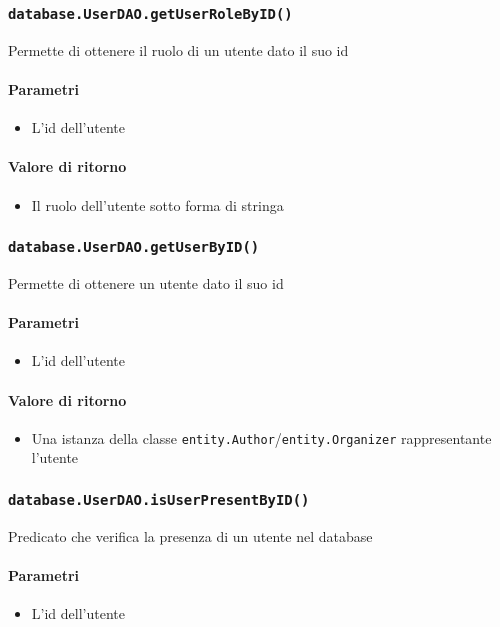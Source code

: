 \subsubsection{\texttt{database.UserDAO.getUserRoleByID()}}
Permette di ottenere il ruolo di un utente dato il suo id
\paragraph{Parametri}
\begin{itemize}
\item L'id dell'utente
\end{itemize}
\paragraph{Valore di ritorno}
\begin{itemize}
\item Il ruolo dell'utente sotto forma di stringa
\end{itemize}

\subsubsection{\texttt{database.UserDAO.getUserByID()}}
Permette di ottenere un utente dato il suo id
\paragraph{Parametri}
\begin{itemize}
\item L'id dell'utente
\end{itemize}
\paragraph{Valore di ritorno}
\begin{itemize}
\item Una istanza della classe
  \texttt{entity.Author}/\texttt{entity.Organizer} rappresentante
  l'utente
\end{itemize}

\subsubsection{\texttt{database.UserDAO.isUserPresentByID()}}
Predicato che verifica la presenza di un utente nel database
\paragraph{Parametri}
\begin{itemize}
\item L'id dell'utente
\end{itemize}
